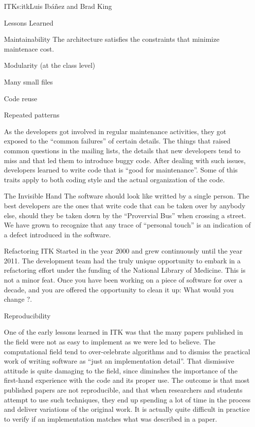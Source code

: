 \begin{aosachapter}{ITK}{s:itk}{Luis Ib\'{a}\~{n}ez and Brad King}
\begin{aosasect1}{Lessons Learned}
\begin{aosasect2}{Maintainability}
The architecture satisfies the constraints that minimize maintenace cost.
\begin{aosaitemize}
\item Modularity (at the class level)
\item Many small files
\item Code reuse
\item Repeated patterns
\end{aosaitemize}
\end{aosasect2}
As the developers got involved in regular maintenance activities, they
got exposed to the ``common failures'' of certain details. The things
that raised common questions in the mailing lists, the details that
new developers tend to miss and that led them to introduce buggy code.
After dealing with such issues, developers learned to write code that
is ``good for maintenance''. Some of this traits apply to both coding
style and the actual organization of the code.

\begin{aosasect2}{The Invisible Hand}
The software should look like writted by a single person. The best
developers are the ones that write code that can be taken over by
anybody else, should they be taken down by the ``Provervial Bus'' when
crossing a street. We have grown to recognize that any trace of
``personal touch'' is an indication of a defect introduced in the
software.
\end{aosasect2}

\begin{aosasect2}{Refactoring}
ITK Started in the year 2000 and grew continuously until the year
2011. The development team had the truly unique opportunity to embark
in a refactoring effort under the funding of the National Library of
Medicine. This is not a minor feat. Once you have been working on a
piece of software for over a decade, and you are offered the
opportunity to clean it up: What would you change ?.
\end{aosasect2}

\begin{aosasect2}{Reproducibility}

One of the early lessons learned in ITK was that the many papers
published in the field were not as easy to implement as we were led to
believe. The computational field tend to over-celebrate algorithms and
to dismiss the practical work of writing software as ``just an
implementation detail''. That dismissive attitude is quite damaging to
the field, since diminshes the importance of the first-hand experience
with the code and its proper use. The outcome is that most published papers
are not reproducible, and that when researchers and students attempt to use
such techniques, they end up spending a lot of time in the process and deliver
variations of the original work. It is actually quite difficult in practice
to verify if an implementation matches what was described in a paper.


\end{aosasect2}
\end{aosasect1}
\end{aosachapter}
